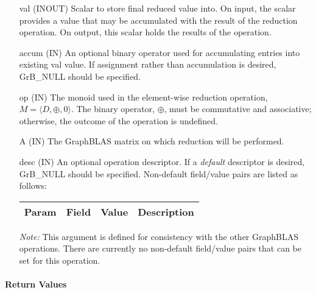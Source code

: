 \begin{itemize}[leftmargin=1.1in]
    \item[{\sf val}]    ({\sf INOUT}) Scalar to store final reduced value into. On input,
    the scalar provides a value that may be accumulated with the result of the
    reduction operation.  On output, this scalar holds the results of the
    operation.

    \item[{\sf accum}] ({\sf IN}) An optional binary operator used for accumulating
    entries into existing {\sf val} value. If assignment rather than accumulation is
    desired, {\sf GrB\_NULL} should be specified.

    \item[{\sf op}]    ({\sf IN}) The monoid used in the element-wise reduction
    operation, $M = \langle D,\oplus,0 \rangle$. The binary operator,
    $\oplus$, must be commutative and associative; otherwise,
    the outcome of the operation is undefined.
    
    \item[{\sf A}]     ({\sf IN}) The GraphBLAS matrix on which
    reduction will be performed.

    \item[{\sf desc}] ({\sf IN}) An optional operation descriptor. If
    a \emph{default} descriptor is desired, {\sf GrB\_NULL} should be
    specified. Non-default field/value pairs are listed as follows:  \\

    \begin{tabular}{lllp{2.5in}}
        Param & Field  & Value & Description \\
        \hline
    \end{tabular}

    \emph{Note:} This argument is defined for consistency with the other GraphBLAS operations.
    There are currently no non-default field/value pairs that can be set for this operation.
\end{itemize}

\paragraph{Return Values}


